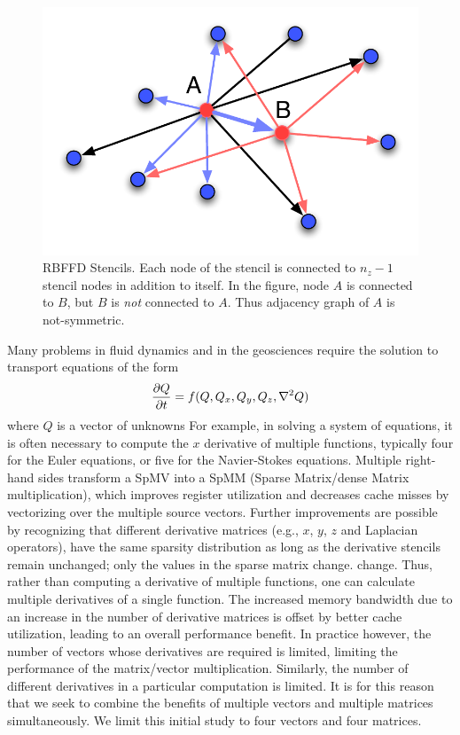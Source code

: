 \documentclass[10pt,conference,compsocconf]{IEEEtran}
\begin{document}
\begin{figure}[tbh]
  \centering
  \includegraphics[width=\linewidth]{figures/rbf_stencils.pdf}
  \caption{RBFFD Stencils. Each node of the stencil is connected to
    $n_z-1$ stencil nodes in addition to itself. In the figure, node
    $A$ is connected to $B$, but $B$ is {\em not\/} connected to
    $A$. Thus adjacency graph of $A$ is not-symmetric.}
  \label{fig:rbf_stencils}
\end{figure}

Many problems in fluid dynamics and in the geosciences require the
solution to transport equations of the form
$$
{\frac{\partial{Q}}{\partial{t}}} = f(Q,Q_x, Q_y, Q_z, \nabla^2 Q)
$$
where $Q$ is a vector of unknowns %
For example, in solving a system of equations, it is
often necessary to compute the $x$ derivative of multiple functions,
typically four for the Euler equations, or five for the Navier-Stokes
equations. Multiple right-hand sides transform a SpMV into a SpMM
(Sparse Matrix/dense Matrix multiplication), which improves register
utilization and decreases cache misses by vectorizing over the
multiple source vectors. Further improvements are possible by
recognizing that different derivative matrices (e.g., $x$, $y$, $z$ 
and Laplacian operators), 
have the same sparsity distribution as long as the derivative stencils
remain unchanged; only the values in the sparse matrix change. 
change.  Thus, rather than computing a derivative of multiple
functions, one can calculate multiple derivatives of a single
function. The increased memory bandwidth due to an increase in the
number of derivative matrices is offset by better cache utilization,
leading to an overall performance benefit. In practice however, the number of 
vectors whose derivatives are required is limited, limiting the 
performance of the matrix/vector multiplication. Similarly, the number
of different derivatives in a particular computation is limited. It is 
for this reason that we seek to combine the benefits of multiple
vectors and multiple matrices simultaneously. We limit this initial 
study to four vectors and four matrices. 
\end{document}
